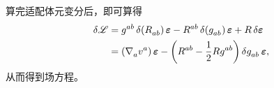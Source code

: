 \begin{Remark}
\begin{enumerate}
				算完适配体元变分后，即可算得
				\begin{equation}
					\begin{split}
						\var{\La} &= \tensor{g}{^a^b} \var(\tensor{R}{_a_b}) \form{\vol} - \tensor{R}{^a^b} \var(\tensor{g}{_a_b}) \form{\vol} + R \var{\form{\vol}}\\
						&= \left( \Nabla{a} \tensor{v}{^a} \right) \form{\vol} - \left( \tensor{R}{^a^b} - \frac{1}{2} R \tensor{g}{^a^b} \right) \var{\tensor{g}{_a_b}} \form{\vol},
					\end{split}
				\end{equation}
				从而得到场方程。
			\end{enumerate}
		\end{Remark}
